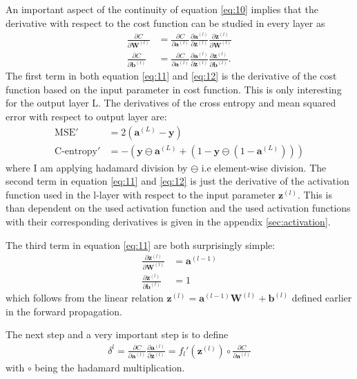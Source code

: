 \documentclass[uio,jmp,amsmath,amssymb,reprint,nofootinbib]{revtex4-1}
\numberwithin{equation}{section}
\newcommand{\lp}{\left(}
\newcommand{\rp}{\right)}
\begin{document}
An important aspect of the continuity of equation \ref{eq:10} implies that the derivative with respect to the cost function can be studied in every layer as
\begin{align}\label{eq:11}
\frac{\partial C}{\partial \bm{W}^{(l)}} &= \frac{\partial C}{\partial \bm{a}^{(l)}}\frac{\partial \bm{a}^{(l)}}{\partial \bm{z}^{(l)}}\frac{\partial \bm{z}^{(l)}}{\partial \bm{W}^{(l)}}\\ \label{eq:12}
\frac{\partial C}{\partial \bm{b}^{(l)}} &= \frac{\partial C}{\partial \bm{a}^{(l)}}\frac{\partial \bm{a}^{(l)}}{\partial \bm{z}^{(l)}}\frac{\partial \bm{z}^{(l)}}{\partial \bm{b}^{(l)}}.
\end{align}
The first term in both equation \ref{eq:11} and \ref{eq:12} is the derivative of the cost function based on the input parameter in cost function. This is only interesting for the output layer L. The derivatives of the cross entropy and mean squared error with respect to output layer are:
\begin{align}
\text{MSE}' &= 2(\bm{a}^{(L)} - \bm{y})\\ \label{eq:c_entropy}
\text{C-entropy}' &= -\lp {\bm{y}}\ominus{\bm{a}^{(L)}} + \lp 1 - {\bm{y}}\ominus {(1-\bm{a}^{(L)})}\rp\rp
\end{align}
where I am applying hadamard division by \(\ominus\) i.e element-wise division. The second term in equation \ref{eq:11} and \ref{eq:12} is just the derivative of the activation function used in the l-layer with respect to the input parameter \(\bm{z}^{(l)}\). This is than dependent on the used activation function and the used activation functions with their corresponding derivatives is given in the appendix \ref{sec:activation}.

The third term in equation \ref{eq:11} are both surprisingly simple:
\begin{align}
\frac{\partial \bm{z}^{(l)}}{\partial \bm{W}^{(l)}} &= \bm{a}^{(l-1)}\\
\frac{\partial \bm{z}^{(l)}}{\partial \bm{b}^{(l)}} &= 1
\end{align}
which follows from the linear relation \(\bm{z}^{(l)} = \bm{a}^{(l-1)}\bm{W}^{(l)} + \bm{b}^{(l)}\) defined earlier in the forward propagation.

The next step and a very important step is to define
\begin{align}\label{eq:13}
\delta^{l} = \frac{\partial C}{\partial \bm{a}^{(l)}}\frac{\partial \bm{a}^{(l)}}{\partial \bm{z}^{(l)}} = f_l'(\bm{z}^{(l)})\circ\frac{\partial C}{\partial \bm{a}^{(l)}}
\end{align}
with \(\circ\) being the hadamard multiplication. 
\end{document}
